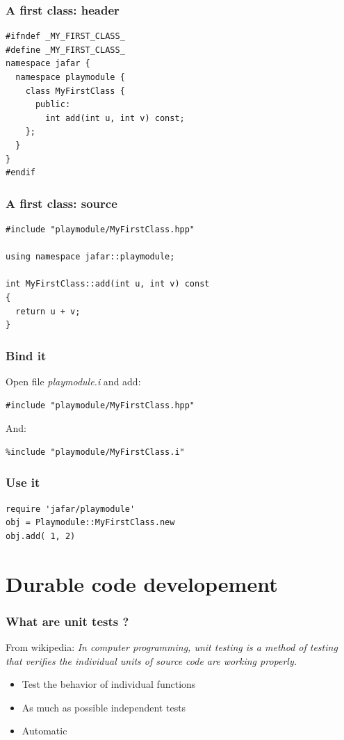 \documentclass[compress]{beamer}
\begin{document}
\begin{frame}[fragile]
  \frametitle{A first class: header}
  \begin{lstlisting}
#ifndef _MY_FIRST_CLASS_
#define _MY_FIRST_CLASS_
namespace jafar {
  namespace playmodule {
    class MyFirstClass {
      public:
        int add(int u, int v) const;
    };
  }
}
#endif
  \end{lstlisting}
\end{frame}

\begin{frame}[fragile]
  \frametitle{A first class: source}
  \begin{lstlisting}
#include "playmodule/MyFirstClass.hpp"

using namespace jafar::playmodule;

int MyFirstClass::add(int u, int v) const
{
  return u + v;
}
  \end{lstlisting}
\end{frame}

\begin{frame}[fragile]
  \frametitle{Bind it}
  Open file \textit{playmodule.i} and add:
  \begin{lstlisting}
#include "playmodule/MyFirstClass.hpp"
  \end{lstlisting}
  And:
  \begin{lstlisting}
%include "playmodule/MyFirstClass.i"
  \end{lstlisting}
\end{frame}

\begin{frame}[fragile]
  \frametitle{Use it}
  \begin{lstlisting}
require 'jafar/playmodule'
obj = Playmodule::MyFirstClass.new
obj.add( 1, 2)
  \end{lstlisting}
\end{frame}


\section{Durable code developement}

\begin{frame}
  \frametitle{What are unit tests ?}
  From wikipedia: \textit{In computer programming, unit testing is a method of
testing that verifies the individual units of source code are working properly.}

  \begin{itemize}
    \item<1-> Test the behavior of individual functions
    \item<2-> As much as possible independent tests
    \item<3-> Automatic
  \end{itemize}

\end{frame}
\end{document}
